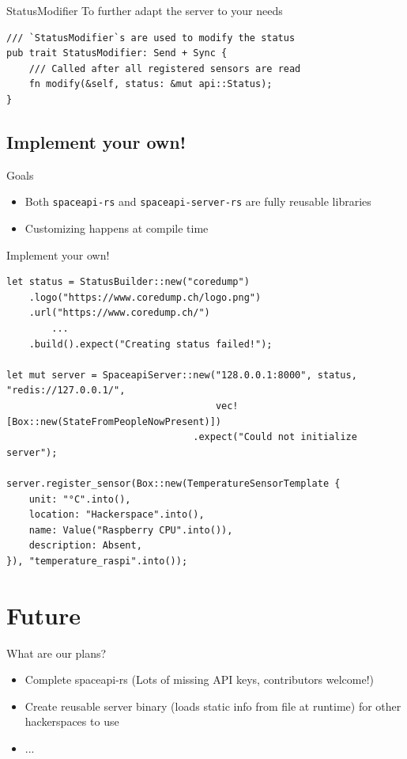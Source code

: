 \begin{frame}[fragile]{StatusModifier}
    To further adapt the server to your needs
    \begin{verbatim}
/// `StatusModifier`s are used to modify the status
pub trait StatusModifier: Send + Sync {
    /// Called after all registered sensors are read
    fn modify(&self, status: &mut api::Status);
}
    \end{verbatim}
\end{frame}


\subsection{Implement your own!}

\begin{frame}[c]{Goals}
    \begin{itemize}
        \item Both \texttt{spaceapi-rs} and \texttt{spaceapi-server-rs} are
            fully reusable libraries
        \item Customizing happens at compile time
    \end{itemize}
\end{frame}

\begin{frame}[fragile]{Implement your own!}
    \begin{verbatim}
let status = StatusBuilder::new("coredump")
    .logo("https://www.coredump.ch/logo.png")
    .url("https://www.coredump.ch/")
        ...
    .build().expect("Creating status failed!");

let mut server = SpaceapiServer::new("128.0.0.1:8000", status, "redis://127.0.0.1/",
                                     vec![Box::new(StateFromPeopleNowPresent)])
                                 .expect("Could not initialize server");

server.register_sensor(Box::new(TemperatureSensorTemplate {
    unit: "°C".into(),
    location: "Hackerspace".into(),
    name: Value("Raspberry CPU".into()),
    description: Absent,
}), "temperature_raspi".into());
    \end{verbatim}
\end{frame}


\section{Future}

\begin{frame}[c]{What are our plans?}
    \begin{itemize}
        \item Complete spaceapi-rs (Lots of missing API keys, contributors
            welcome!)
        \item Create reusable server binary (loads static info from file at
            runtime) for other hackerspaces to use
        \item ...
    \end{itemize}
\end{frame}

